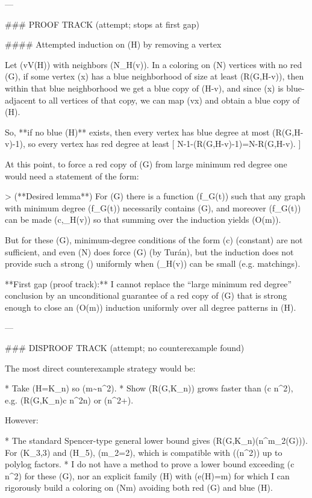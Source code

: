 ---

### PROOF TRACK (attempt; stops at first gap)

#### Attempted induction on (H) by removing a vertex

Let (v\in V(H)) with neighbors (N_H(v)). In a coloring on (N) vertices with no red (G), if some vertex (x) has a blue neighborhood of size at least (R(G,H-v)), then within that blue neighborhood we get a blue copy of (H-v), and since (x) is blue-adjacent to all vertices of that copy, we can map (v\mapsto x) and obtain a blue copy of (H).

So, **if no blue (H)** exists, then every vertex has blue degree at most (R(G,H-v)-1), so every vertex has red degree at least
[
N-1-(R(G,H-v)-1)=N-R(G,H-v).
]

At this point, to force a red copy of (G) from large minimum red degree one would need a statement of the form:

> (**Desired lemma**) For (G) there is a function (f_G(t)) such that any graph with minimum degree (\ge f_G(t)) necessarily contains (G), and moreover (f_G(t)) can be made (\le c,\deg_H(v)) so that summing over the induction yields (O(m)).

But for these (G), minimum-degree conditions of the form (\delta\ge c) (constant) are not sufficient, and even (\delta\ge \alpha N) does force (G) (by Turán), but the induction does not provide such a strong (\alpha) uniformly when (\deg_H(v)) can be small (e.g. matchings).

**First gap (proof track):** I cannot replace the “large minimum red degree” conclusion by an unconditional guarantee of a red copy of (G) that is strong enough to close an (O(m)) induction uniformly over all degree patterns in (H).

---

### DISPROOF TRACK (attempt; no counterexample found)

The most direct counterexample strategy would be:

* Take (H=K_n) so (m\sim n^2).
* Show (R(G,K_n)) grows faster than (c n^2), e.g. (R(G,K_n)\ge c n^2\log n) or (n^{2+\varepsilon}).

However:

* The standard Spencer-type general lower bound gives (R(G,K_n)\gtrsim \tilde\Omega(n^{m_2(G)})). For (K_{3,3}) and (H_5), (m_2=2), which is compatible with (\Theta(n^2)) up to polylog factors.
* I do not have a method to prove a lower bound exceeding (c n^2) for these (G), nor an explicit family (H) with (e(H)=m) for which I can rigorously build a coloring on (N\gg m) avoiding both red (G) and blue (H).

